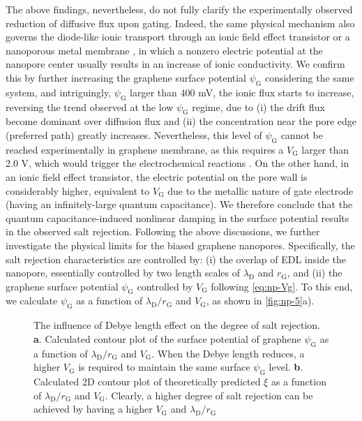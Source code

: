 The above findings, nevertheless, do not fully clarify the
experimentally observed reduction of diffusive flux upon
gating. Indeed, the same physical mechanism also governs the
diode-like ionic transport through an ionic field effect transistor
\autocite{Nam_2009_IFET_sub10nm,Lee_2015_sub10nm,Feng_2016_porous_MoS2}
or a nanoporous metal membrane
\autocite{Mccurry_2017_electrolyte_porus_gold}, in which a nonzero
electric potential at the nanopore center usually results in an
increase of ionic conductivity. We confirm this by further increasing
the graphene surface potential $\psi_{\mathrm{G}}$ considering the
same system, and intriguingly, $\psi_{\mathrm{G}}$ larger than 400 mV,
the ionic flux starts to increase, reversing the trend observed at the
low $\psi_{\mathrm{G}}$ regime, due to (i) the drift flux become
dominant over diffusion flux and (ii) the concentration near the pore
edge (preferred path) greatly increases.
Nevertheless, this level of $\psi_{\mathrm{G}}$ cannot be
reached experimentally in graphene membrane, as this requires a
$V_{\mathrm{G}}$ larger than 2.0 V, which would trigger the electrochemical
reactions \autocite{Toh_2011_GO_electrochem}.
%
On the other hand, in an ionic field effect transistor, the electric
potential on the pore wall is considerably higher, equivalent to
$V_{\mathrm{G}}$ due to the metallic nature of gate electrode (having
an infinitely-large quantum capacitance). We therefore conclude that
the quantum capacitance-induced nonlinear damping in the surface
potential results in the observed salt rejection.  Following the above
discussions, we further investigate the physical limits for the biased
graphene nanopores. Specifically, the salt rejection characteristics
are controlled by: (i) the overlap of EDL inside the nanopore,
essentially controlled by two length scales of $\lambda_{\mathrm{D}}$
and $r_{\mathrm{G}}$, and (ii) the graphene surface potential
$\psi_{\mathrm{G}}$ controlled by $V_{\mathrm{G}}$ following
 \autoref{eq:np-Vg}. To this end, we calculate $\psi_{\mathrm{G}}$ as a
function of $\lambda_{\mathrm{D}} / r_{\mathrm{G}}$ and
$V_{\mathrm{G}}$, as shown in  \autoref{fig:np-5}a).
\begin{figure}[!htbp]
  \centering
  \caption{The influence of Debye length effect on the degree of salt
      rejection. \textbf{a}. Calculated contour plot of the surface
    potential of graphene $\psi_{\mathrm{G}}$ as a function of
    $\lambda_{\mathrm{D}}/r_{\mathrm{G}}$ and $V_{\mathrm{G}}$. When
    the Debye length reduces, a higher $V_{\mathrm{G}}$ is required to
    maintain the same surface $\psi_{\mathrm{G}}$
    level. \textbf{b}. Calculated 2D contour plot of theoretically
    predicted $\xi$ as a function of
    $\lambda_{\mathrm{D}}/r_{\mathrm{G}}$ and
    $V_{\mathrm{G}}$. Clearly, a higher degree of salt rejection can
    be achieved by having a higher $V_{\mathrm{G}}$ and
    $\lambda_{\mathrm{D}}/r_{\mathrm{G}}$}
  \label{fig:np-5}
\end{figure}
